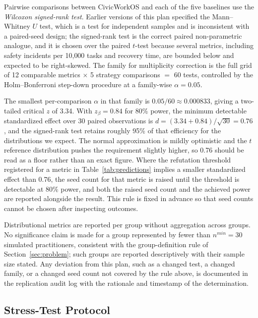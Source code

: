 	Pairwise comparisons between CivicWorkOS and each of the five baselines use the \textit{Wilcoxon signed-rank test}. Earlier versions of this plan specified the Mann--Whitney $U$ test, which is a test for independent samples and is inconsistent with a paired-seed design; the signed-rank test is the correct paired non-parametric analogue, and it is chosen over the paired $t$-test because several metrics, including safety incidents per 10{,}000 tasks and recovery time, are bounded below and expected to be right-skewed. The family for multiplicity correction is the full grid of 12 comparable metrics $\times$ 5 strategy comparisons $=$ 60 tests, controlled by the Holm--Bonferroni step-down procedure at a family-wise $\alpha=0.05$.
	
	The smallest per-comparison $\alpha$ in that family is $0.05/60 \approx 0.000833$, giving a two-tailed critical $z$ of 3.34. With $z_\beta = 0.84$ for 80\% power, the minimum detectable standardized effect over 30 paired observations is $d = (3.34+0.84)/\sqrt{30} = 0.76$, and the signed-rank test retains roughly 95\% of that efficiency for the distributions we expect. The normal approximation is mildly optimistic and the $t$ reference distribution pushes the requirement slightly higher, so 0.76 should be read as a floor rather than an exact figure. Where the refutation threshold registered for a metric in Table~\ref{tab:predictions} implies a smaller standardized effect than 0.76, the seed count for that metric is raised until the threshold is detectable at 80\% power, and both the raised seed count and the achieved power are reported alongside the result. This rule is fixed in advance so that seed counts cannot be chosen after inspecting outcomes.
	
	Distributional metrics are reported per group without aggregation across groups. No significance claim is made for a group represented by fewer than $n^{min}=30$ simulated practitioners, consistent with the group-definition rule of Section~\ref{sec:problem}; such groups are reported descriptively with their sample size stated. Any deviation from this plan, such as a changed test, a changed family, or a changed seed count not covered by the rule above, is documented in the replication audit log with the rationale and timestamp of the determination.
	
	\subsection{Stress-Test Protocol}
	\label{sec:stress}
	
